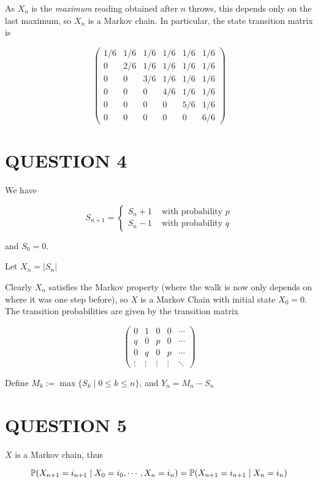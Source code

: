 \documentclass[a4paper]{article}
\begin{document}
As $ X_{n} $ is the \emph{maximum} reading obtained after $ n $ throws, this depends only on the last maximum, so $ X_{n} $ is a Markov chain. In particular, the state transition matrix is


\[ \begin{pmatrix}
1/6 & 1/6 & 1/6 & 1/6 & 1/6 & 1/6  \\
0 & 2/6 & 1/6 & 1/6 & 1/6 & 1/6  \\
0 & 0 & 3/6 & 1/6 & 1/6 & 1/6  \\
0 & 0 & 0 & 4/6 & 1/6 & 1/6 \\
0 & 0 & 0 & 0 & 5/6 & 1/6  \\
0 & 0 & 0 & 0 & 0 & 6/6 
\end{pmatrix} \]


\section{QUESTION 4}

We have

\[ S_{n+1} = \begin{cases} S_{n} + 1  & \text{ with probability } p  \\ S_{n} - 1& \text{ with probability } q \end{cases} \]

and $ S_{0} = 0 $.

Let $ X_{n} = | S_{n} | $

Clearly $ X_{n} $ satisfies the Markov property (where the walk is now only depends on where it was one step before), so $ X $ is a Markov Chain with initial state $ X_{0} = 0 $. The transition probabilities are given by the transition matrix

\[ \begin{pmatrix}
0 & 1 & 0 & 0 & \cdots \\
q & 0 & p & 0 & \cdots \\
0 & q & 0 & p & \cdots \\
\vdots & \vdots & \vdots & \vdots & \ddots
\end{pmatrix} \]

Define $ M_{k} := \max \{ S_{k} \; | \; 0 \leq k \leq n \} $, and $ Y_{n} = M_{n} - S_{n} $

\section{QUESTION 5}

$ X $ is a Markov chain, thus

\[ \P( X_{n+1} = i_{n+1} \; | \; X_{0} = i_{0}, \cdots, X_{n} = i_{n} ) = \P(X_{n+1} = i_{n+1} \; | \; X_{n} = i_{n} ) \]
\end{document}
